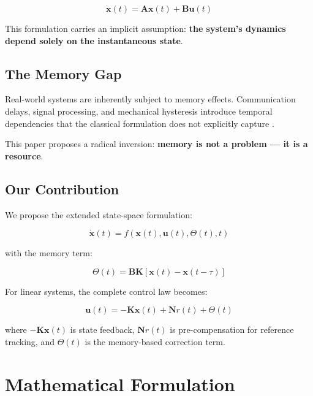 \documentclass[12pt,a4paper]{article}
\begin{document}
\begin{equation}
\dot{\mathbf{x}}(t) = \mathbf{A}\mathbf{x}(t) + \mathbf{B}\mathbf{u}(t)
\label{eq:classical}
\end{equation}

This formulation carries an implicit assumption: \textbf{the 
system's dynamics depend solely on the instantaneous state}.

\subsection{The Memory Gap}

Real-world systems are inherently subject to memory effects. 
Communication delays, signal processing, and mechanical hysteresis 
introduce temporal dependencies that the classical formulation 
does not explicitly capture \cite{richard2003}.

This paper proposes a radical inversion: \textbf{memory is not a 
problem — it is a resource}.

\subsection{Our Contribution}

We propose the extended state-space formulation:

\begin{equation}
\boxed{\dot{\mathbf{x}}(t) = f\left(\mathbf{x}(t), \mathbf{u}(t), \Theta(t), t\right)}
\label{eq:proposed}
\end{equation}

with the memory term:

\begin{equation}
\Theta(t) = \mathbf{BK}\left[\mathbf{x}(t) - \mathbf{x}(t-\tau)\right]
\label{eq:theta}
\end{equation}

For linear systems, the complete control law becomes:

\begin{equation}
\mathbf{u}(t) = -\mathbf{K}\mathbf{x}(t) + \mathbf{N}r(t) + \Theta(t)
\label{eq:control_law}
\end{equation}

where $-\mathbf{K}\mathbf{x}(t)$ is state feedback, $\mathbf{N}r(t)$ 
is pre-compensation for reference tracking, and $\Theta(t)$ is the 
memory-based correction term.

\section{Mathematical Formulation}
\end{document}
